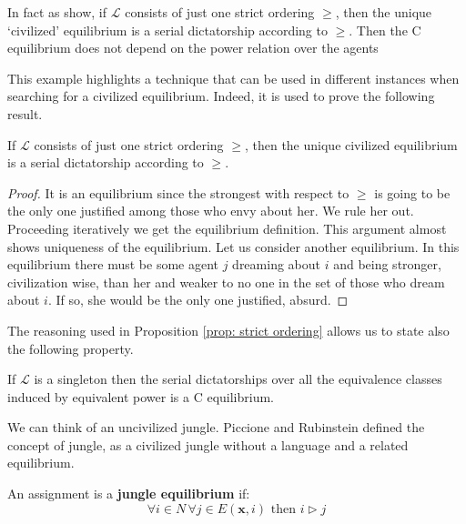
\color{black}{A language truly brings civilization to a jungle if it has more than one criterion.}\color{black}{} In fact as \cite[RY]{RY} show, if $\mathcal{L}$ consists of just one strict ordering $\geq$, then the unique `civilized' equilibrium is a serial dictatorship according to $\geq$. Then the C equilibrium does not depend on the power relation over the agents\color{black}{ and the civilized jungle is just a normal jungle with another power relation.}  \color{black} 

This example highlights a technique that can be used in different instances when searching for a civilized equilibrium. Indeed, it is used to prove the following result.

\begin{proposition}\label{prop: strict ordering}
    If $\mathcal{L}$ consists of just one strict ordering $\geq$, then the unique civilized equilibrium is a serial dictatorship according to $\geq$.
    \begin{proof}
        It is an equilibrium since the strongest with respect to $\geq$ is going to be the only one justified among those who envy about her. We rule her out. Proceeding iteratively we get the equilibrium definition. This argument almost shows uniqueness of the equilibrium. Let us consider another equilibrium. In this equilibrium there must be some agent $j$ dreaming about $i$ and being stronger, civilization wise, than her and weaker to no one in the set of those who dream about $i$. If so, she would be the only one justified, absurd.
    \end{proof}
\end{proposition}

The reasoning used in Proposition \ref{prop: strict ordering} allows us to state also the following property.

\begin{proposition}\label{prop: L singleton}
    If $\mathcal{L}$ is a singleton then the serial dictatorships over all the equivalence classes induced by equivalent power is a C equilibrium.  
\end{proposition}

We can think of an uncivilized jungle. Piccione and Rubinstein \cite[PR]{P-R} defined the concept of jungle, as a civilized jungle without a language and a related equilibrium.

\begin{definition}
    An assignment is a \textbf{jungle equilibrium} if: \[\forall i \in N \, \forall j \in E(\textbf{x},i) \text{ then } i\triangleright j\]
\end{definition}

